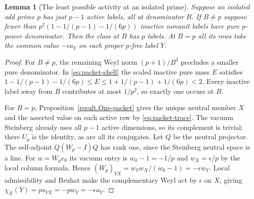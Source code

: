 \documentclass[11pt]{amsart}
\numberwithin{equation}{section}
\newtheorem{lemma}[theorem]{Lemma}
\theoremstyle{definition}
\theoremstyle{plain}
\begin{document}
\begin{lemma}[The least possible activity at an isolated prime]\label{result:packet-idempotent}
Suppose an isolated odd prime $p$ has just $p-1$ active labels,
all at denominator $B$. If $B\ne p$ suppose fewer than
$p^2(1-1/(p-1)-1/(6p))$ inactive nonunit labels have pure $p$-power
denominator. Then the class at $B$ has $p$ labels. At $B=p$ all its
rows take the common value $-\epsilon a_Y$ on each proper $p$-free
label $Y$.
\end{lemma}
\begin{proof}
For $B\ne p$, the remaining Weyl norm $(p+1)/B^2$ precludes a
smaller pure denominator. In \eqref{eq:packet-shell} the scaled
inactive pure mass $E$ satisfies
$1-1/(p-1)-1/(6p)\le E\le1+1/(p-1)+1/(6p)<2$.
Every inactive label away from $B$ contributes at most $1/p^2$,
so exactly one occurs at $B$.

For $B=p$, Proposition~\ref{result.One-packet} gives the unique neutral
member $X$ and the asserted value on each active row by
\eqref{eq:packet-trace}. The vacuum Steinberg already uses all
$p-1$ active dimensions, so its complement is trivial: there $U_p$
is the identity, as are all its conjugates. Let $Q$ be the neutral
projector. The self-adjoint $Q(W_p-I)Q$ has rank one, since the
Steinberg neutral space is a line. For $w=W_pe_0$ its vacuum
entry is $w_0-1=-1/p$ and $w_X=\epsilon/p$ by the local column
formula. Hence $(W_p)_{YX}=w_Yw_X/(w_0-1)=-\epsilon w_Y$.
Local admissibility and Bruhat make the complementary Weyl act by $\epsilon$ on $X$, giving
$\chi_X(Y)=p s_{YX}=-p w_Y=-\epsilon a_Y$.
\end{proof}
\end{document}
